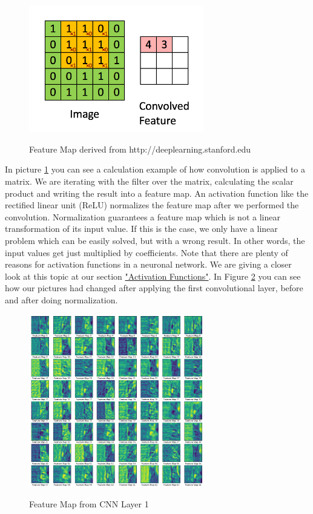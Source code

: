 \documentclass[journal]{IEEEtran}
\begin{document}
\begin{figure}
  \begin{center}
  \includegraphics[width=3in]{photo/cnn.png}\\
  \caption{Feature Map derived from http://deeplearning.stanford.edu}\label{featuremap}
  \end{center}
\end{figure}

In picture \ref{featuremap} you can see a calculation example of how convolution is applied to a matrix. We are iterating with the filter over the matrix, calculating the scalar product and writing the result into a feature map. An activation function like the rectified linear unit (ReLU) normalizes the feature map after we performed the convolution. Normalization guarantees a feature map which is not a linear transformation of its input value. If this is the case, we only have a linear problem which can be easily solved, but with a wrong result. In other words, the input values get just multiplied by coefficients. Note that there are plenty of reasons for activation functions in a neuronal network. We are giving a closer look at this topic at our section \hyperref[sec:activationFunctions]{"Activation Functions"}. In Figure \ref{featuremap1} you can see how our pictures had changed after applying the first convolutional layer, before and after doing normalization.  \\

\begin{figure}
  \begin{center}
  \includegraphics[width=3in]{photo/feature_map1.png}\\
  \caption{Feature Map from CNN Layer 1}\label{featuremap1}
  \end{center}
\end{figure}
\end{document}
